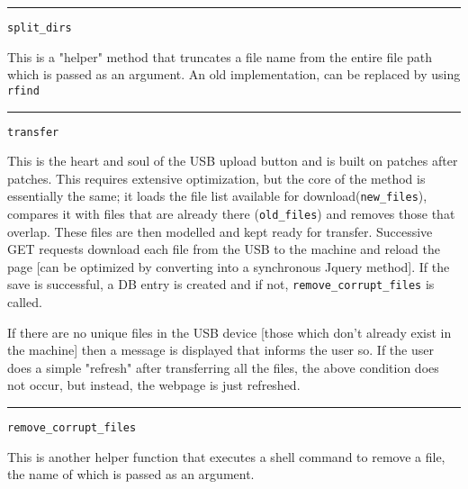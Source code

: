 \documentclass[12pt]{article}
\begin{document}
\noindent\rule[0.5ex]{\linewidth}{0.5pt}
\texttt{split\_dirs}

{\normalsize
	This is a "helper" method that truncates a file name from the entire file path which is passed as an argument. An old implementation, can be replaced by using \texttt{rfind}}
	
\noindent\rule[0.5ex]{\linewidth}{0.5pt}
\texttt{transfer}

{\normalsize
	This is the heart and soul of the USB upload button and is built on patches after patches. This requires extensive optimization, but the core of the method is essentially the same; it loads the file list available for download(\texttt{new\_files}), compares it with files that are already there (\texttt{old\_files}) and removes those that overlap. These files are then modelled and kept ready for transfer. Successive GET requests download each file from the USB to the machine and reload the page [can be optimized by converting into a synchronous Jquery method]. If the save is successful, a DB entry is created and if not, \texttt{remove\_corrupt\_files} is called.
	
	If there are no unique files in the USB device [those which don't already exist in the machine] then a message is displayed that informs the user so. If the user does a simple "refresh" after transferring all the files, the above condition does not occur, but instead, the webpage is just refreshed.}

\noindent\rule[0.5ex]{\linewidth}{0.5pt}
\texttt{remove\_corrupt\_files}

{\normalsize
	This is another helper function that executes a shell command to remove a file, the name of which is passed as an argument.}
\end{document}
